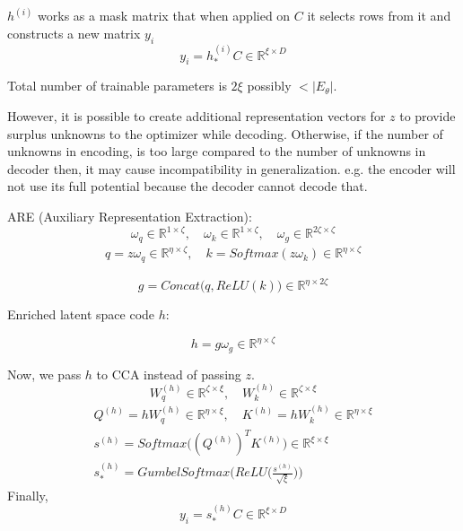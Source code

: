 \documentclass{article}
\begin{document}
$h^{(i)}$ works as a mask matrix that when applied on $C$ it selects rows from it and constructs a new matrix $y_{i}$
\begin{equation*}
	y_{i} = h_{*}^{(i)} C \in \mathbb{R}^{\xi \times D}
\end{equation*}

\begin{tcolorbox}
	\begin{center}
		Total number of trainable parameters is $2\xi$ possibly $< \vert E_{\theta} \vert$.
	\end{center}

	\par 
	However, it is possible to create additional representation vectors for $z$ to provide surplus unknowns to the optimizer while decoding. Otherwise, if the number of unknowns in encoding, is too large compared to the number of unknowns in decoder then, it may cause incompatibility in generalization. e.g. the encoder will not use its full potential because the decoder cannot decode that.
\end{tcolorbox}

ARE (Auxiliary Representation Extraction):
\begin{equation}
	\omega_{q} \in \mathbb{R}^{1 \times \zeta}, \quad \omega_{k} \in \mathbb{R}^{1 \times \zeta}, \quad \omega_{g} \in \mathbb{R}^{2\zeta \times \zeta}
\end{equation}
\begin{eqnarray}
	q = z \omega_q \in \mathbb{R}^{\eta \times \zeta}, \quad k = \textit{Softmax}(z \omega_k) \in \mathbb{R}^{\eta \times \zeta}
\end{eqnarray}

\begin{equation}
g = \textit{Concat}\Big(q, \textit{ReLU}(k)\Big) \in \mathbb{R}^{\eta \times 2\zeta}
\end{equation}

Enriched latent space code $h$:

\begin{equation}
	h = g \omega_{g} \in \mathbb{R}^{\eta \times \zeta}
\end{equation}

Now, we pass $h$ to CCA instead of passing $z$.
\begin{equation}
	W_{q}^{(h)} \in \mathbb{R}^{\zeta \times \xi}, \quad W_{k}^{(h)} \in \mathbb{R}^{\zeta \times \xi}
\end{equation}
\begin{eqnarray}
	Q^{(h)} = h W_q^{(h)} \in \mathbb{R}^{\eta \times \xi}, \quad K^{(h)} = h W_k^{(h)} \in \mathbb{R}^{\eta \times \xi} \\
	s^{(h)} = \textit{Softmax}\Big((Q^{(h)})^T K^{(h)}\Big) \in \mathbb{R}^{\xi \times \xi} \\
	s_{*}^{(h)} = \textit{GumbelSoftmax}\Bigg(\textit{ReLU}\Bigg(\frac{s^{(h)}}{\sqrt{\xi}}\Bigg)\Bigg)
\end{eqnarray}
Finally, 
\begin{equation*}
	y_{i} = s_{*}^{(h)} C \in \mathbb{R}^{\xi \times D}
\end{equation*}
\end{document}
